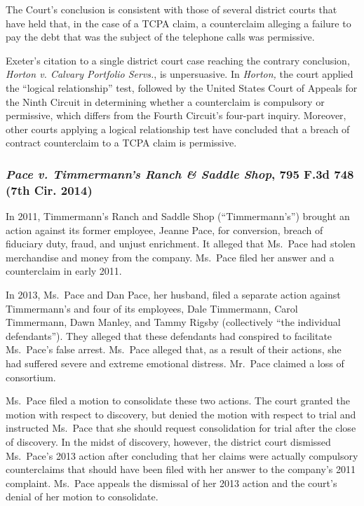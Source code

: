 \documentclass[11pt,letterpaper,twoside]{article}
\begin{document}
The Court's conclusion is consistent with those of several district
courts that have held that, in the case of a TCPA claim, a counterclaim
alleging a failure to pay the debt that was the subject of the telephone
calls was permissive.

Exeter's citation to a single district court case reaching the contrary
conclusion, \emph{Horton v. Calvary Portfolio Servs.}, is unpersuasive.
In \emph{Horton,} the court applied the ``logical relationship'' test,
followed by the United States Court of Appeals for the Ninth Circuit in
determining whether a counterclaim is compulsory or permissive, which
differs from the Fourth Circuit's four-part inquiry. Moreover, other
courts applying a logical relationship test have concluded that a breach
of contract counterclaim to a TCPA claim is permissive.

\subsubsection{\texorpdfstring{\emph{Pace v. Timmermann's Ranch \&
Saddle Shop}, 795 F.3d 748 (7th Cir.
2014)}{Pace v. Timmermann's Ranch \& Saddle Shop, 795 F.3d 748 (7th Cir. 2014)}}\label{pacetimmermannsranchsaddle_7thcir2014}

In 2011, Timmermann's Ranch and Saddle Shop (``Timmermann's'') brought
an action against its former employee, Jeanne Pace, for conversion,
breach of fiduciary duty, fraud, and unjust enrichment. It alleged that
Ms.~Pace had stolen merchandise and money from the company. Ms.~Pace
filed her answer and a counterclaim in early 2011.

In 2013, Ms.~Pace and Dan Pace, her husband, filed a separate action
against Timmermann's and four of its employees, Dale Timmermann, Carol
Timmermann, Dawn Manley, and Tammy Rigsby (collectively ``the individual
defendants''). They alleged that these defendants had conspired to
facilitate Ms.~Pace's false arrest. Ms.~Pace alleged that, as a result
of their actions, she had suffered severe and extreme emotional
distress. Mr.~Pace claimed a loss of consortium.

Ms.~Pace filed a motion to consolidate these two actions. The court
granted the motion with respect to discovery, but denied the motion with
respect to trial and instructed Ms.~Pace that she should request
consolidation for trial after the close of discovery. In the midst of
discovery, however, the district court dismissed Ms.~Pace's 2013 action
after concluding that her claims were actually compulsory counterclaims
that should have been filed with her answer to the company's 2011
complaint. Ms.~Pace appeals the dismissal of her 2013 action and the
court's denial of her motion to consolidate.
\end{document}

